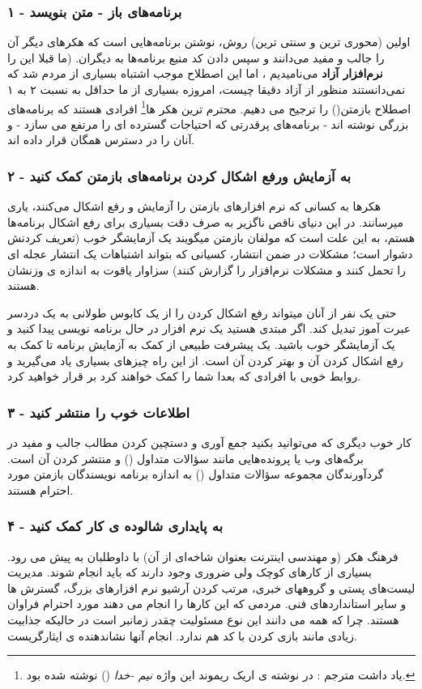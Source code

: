 \subsubsection*{۱ - برنامه‌های باز - متن بنویسد}
اولین (محوری ترین و سنتی ترین) روش، نوشتن برنامه‌هایی است که هکرهای دیگر آن را جالب و مفید می‌دانند و سپس دادن کد منبع برنامه‌ها به دیگران.
(ما قبلا این را
\textbf{نرم‌افزار آزاد}
می‌نامیدیم ، اما این اصطلاح موجب اشتباه بسیاری از مردم شد که نمی‌دانستند منظور از آزاد دقیقا چیست، امروزه بسیاری از ما حداقل به نسبت ۲ به ۱ اصطلاح بازمتن()
را ترجیح می دهیم.
محترم ترین هکر ها\footnote{ یاد داشت مترجم : در نوشته ی اریک ریموند این واژه \emph{نیم -خدا} () نوشته شده بود.}
افرادی هستند که برنامه‌های بزرگی نوشته اند - برنامه‌های پرقدرتی که احتیاجات گسترده ای را مرتفع می سازد - و آنان را در دسترس همگان قرار داده اند.
\subsubsection*{۲ - به آزمایش ورفع اشکال کردن برنامه‌های بازمتن کمک کنید}
هکرها به کسانی که نرم افزارهای بازمتن را آزمایش و رفع اشکال می‌کنند، یاری میرسانند. در این دنیای ناقص ناگزیر به صرف دقت بسیاری برای رفع اشکال برنامه‌ها هستم، به این علت است که مولفان بازمتن میگویند یک آزمایشگر خوب (تعریف کردنش دشوار است؛ مشکلات در ضمن انتشار، کسیانی که بتواند اشتباهات یک انتشار عجله ‌ای را تحمل کنند و مشکلات نرم‌افزار را گزارش کنند) سزاوار یاقوت به اندازه ی وزنشان هستند. 

حتی یک نفر از آنان میتواند رفع اشکال کردن را از یک کابوس طولانی به یک دردسر عبرت آموز تبدیل کند. اگر مبتدی هستید یک نرم افزار در حال برنامه نویسی پیدا کنید و یک آزمایشگر خوب باشید. یک پیشرفت طبیعی از کمک به آزمایش برنامه تا کمک به رفع اشکال کردن آن و بهتر کردن آن است. از این راه چیزهای بسیاری یاد می‌گیرید و روابط خوبی با افرادی که بعدا شما را کمک خواهند کرد بر قرار خواهید کرد.
\subsubsection*{۳ - اطلاعات خوب را منتشر کنید}
کار خوب دیگری که می‌توانید بکنید جمع آوری و دستچین کردن مطالب جالب و مفید در برگه‌های وب یا پرونده‌هایی مانند سؤالات متداول () و منتشر کردن آن است. گردآورندگان مجموعه سؤالات متداول () به اندازه برنامه نویسندگان بازمتن مورد احترام هستند.
\subsubsection*{۴ - به پایداری شالوده ی کار کمک کنید}
فرهنگ هکر (و مهندسی اینترنت بعنوان شاخه‌ای از آن) با داوطلبان به پیش می رود. بسیاری از کارهای کوچک ولی ضروری وجود دارند که باید انجام شوند. مدیریت لیست‌های پستی و گروههای خبری، مرتب کردن آرشیو نرم افزارهای بزرگ، گسترش 
ها و سایر استانداردهای فنی.
مردمی که این کارها را انجام می دهند مورد احترام فراوان هستند. چرا که همه می دانند این نوع مسئولیت چقدر زمانبر است در حالیکه جذابیت زیادی مانند بازی کردن با کد هم ندارد. انجام آنها نشاندهنده ی ایثارگریست.
